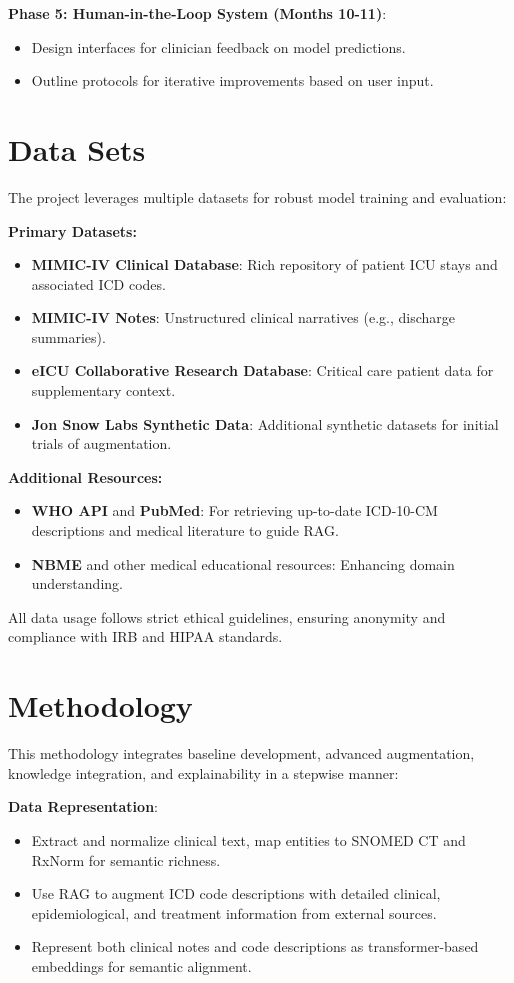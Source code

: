 \documentclass[10pt,a4paper]{article}
\begin{document}
\textbf{Phase 5: Human-in-the-Loop System (Months 10-11)}:
\begin{itemize}
    \item Design interfaces for clinician feedback on model predictions.
    \item Outline protocols for iterative improvements based on user input.
\end{itemize}

\section{Data Sets}
The project leverages multiple datasets for robust model training and evaluation:

\textbf{Primary Datasets:}
\begin{itemize}
    \item \textbf{MIMIC-IV Clinical Database}: Rich repository of patient ICU stays and associated ICD codes.
    \item \textbf{MIMIC-IV Notes}: Unstructured clinical narratives (e.g., discharge summaries).
    \item \textbf{eICU Collaborative Research Database}: Critical care patient data for supplementary context.
    \item \textbf{Jon Snow Labs Synthetic Data}: Additional synthetic datasets for initial trials of augmentation.
\end{itemize}

\textbf{Additional Resources:}
\begin{itemize}
    \item \textbf{WHO API} and \textbf{PubMed}: For retrieving up-to-date ICD-10-CM descriptions and medical literature to guide RAG.
    \item \textbf{NBME} and other medical educational resources: Enhancing domain understanding.
\end{itemize}

All data usage follows strict ethical guidelines, ensuring anonymity and compliance with IRB and HIPAA standards.

\section{Methodology}
This methodology integrates baseline development, advanced augmentation, knowledge integration, and explainability in a stepwise manner:

\textbf{Data Representation}:
\begin{itemize}
    \item Extract and normalize clinical text, map entities to SNOMED CT and RxNorm for semantic richness.
    \item Use RAG to augment ICD code descriptions with detailed clinical, epidemiological, and treatment information from external sources.
    \item Represent both clinical notes and code descriptions as transformer-based embeddings for semantic alignment.
\end{itemize}
\end{document}
